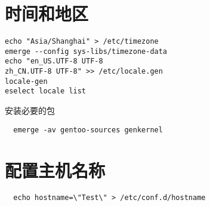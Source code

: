 \section{时间和地区}
\begin{lstlisting}
echo "Asia/Shanghai" > /etc/timezone
emerge --config sys-libs/timezone-data
echo "en_US.UTF-8 UTF-8
zh_CN.UTF-8 UTF-8" >> /etc/locale.gen
locale-gen
eselect locale list

\end{lstlisting}

安装必要的包

\begin{lstlisting}
  emerge -av gentoo-sources genkernel 
\end{lstlisting}
\section{配置主机名称}
\begin{lstlisting}
  echo hostname=\"Test\" > /etc/conf.d/hostname
\end{lstlisting}
